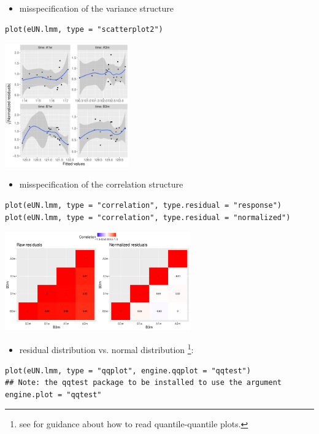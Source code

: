 \documentclass[12pt]{article}
\begin{document}
\begin{itemize}
\item misspecification of the variance structure
\end{itemize}
\lstset{language=r,label= ,caption= ,captionpos=b,numbers=none}
\begin{lstlisting}
plot(eUN.lmm, type = "scatterplot2")
\end{lstlisting}

\begin{center}
\includegraphics[width=0.4\textwidth]{./figures/diag-scatterplot2.pdf}
\end{center}

\clearpage

\begin{itemize}
\item misspecification of the correlation structure
\end{itemize}

\lstset{language=r,label= ,caption= ,captionpos=b,numbers=none}
\begin{lstlisting}
plot(eUN.lmm, type = "correlation", type.residual = "response")
plot(eUN.lmm, type = "correlation", type.residual = "normalized")
\end{lstlisting}

\begin{center}
\includegraphics[width=0.6\textwidth]{./figures/diag-correlation.pdf}
\end{center}

\begin{itemize}
\item residual distribution vs. normal distribution \footnote{see \cite{oldford2016self} for guidance
about how to read quantile-quantile plots.}:
\end{itemize}
\lstset{language=r,label= ,caption= ,captionpos=b,numbers=none}
\begin{lstlisting}
plot(eUN.lmm, type = "qqplot", engine.qqplot = "qqtest")
## Note: the qqtest package to be installed to use the argument engine.plot = "qqtest" 
\end{lstlisting}
\end{document}
